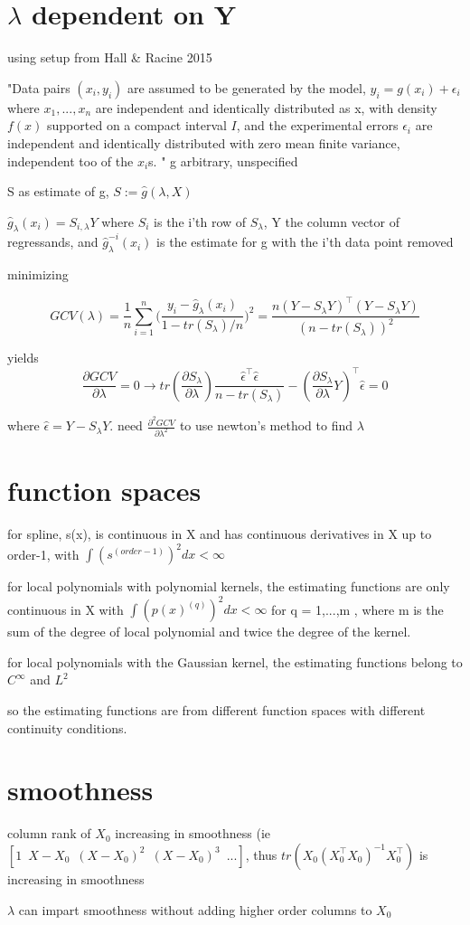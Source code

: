 \documentclass[11pt]{article}
\begin{document}
\section{$\lambda$ dependent on Y}
using setup from Hall \& Racine 2015

"﻿Data pairs $(x_i,y_i)$  are assumed to be generated by the model,  $y_i = g(x_i)+\epsilon_i$ where $x_1,...,x_n$ are independent and identically distributed as x, with density $f(x)$ supported on a compact interval $I$, and the experimental errors $\epsilon_i$ are independent and identically distributed with zero mean finite variance, independent too of the $x_i$s. "  g arbitrary, unspecified

S as estimate of g, $S := \hat{g}(\lambda, X)$

$\hat{g}_\lambda(x_i) = S_{i,\lambda}Y$ where $S_i$ is the i'th row of $S_\lambda$, Y the column vector of regressands, and $\hat{g}_\lambda^{-i}(x_i)$ is the estimate for g with the i'th data point removed

minimizing 

$$GCV(\lambda) = \frac{1}{n} \sum\limits_{i=1}^n \Big(\frac{y_i-\hat{g}_\lambda(x_i)}{1-tr(S_\lambda)/n} \Big)^2 = \frac{n(Y-S_\lambda Y)^\top(Y-S_\lambda Y)}{(n-tr(S_\lambda))^2}$$

yields 
$$\frac{\partial GCV}{\partial \lambda} = 0 \rightarrow  tr(\frac{\partial S_\lambda}{\partial \lambda})\frac{\hat{\epsilon}^\top\hat{\epsilon}}{n-tr(S_\lambda)} - (\frac{\partial S_\lambda}{\partial \lambda}Y)^\top \hat{\epsilon}  =0$$

where $\hat{\epsilon} = Y-S_\lambda Y$. need $\frac{\partial ^2 GCV}{\partial \lambda ^2}$ to use newton's method to find $\lambda$

\section{function spaces}

for spline, s(x), is continuous in X and has continuous derivatives in X up to order-1, with $\int (s^{(order-1)})^2 dx < \infty$

for local polynomials with polynomial kernels, the estimating functions are only continuous in X with 
$\int (p(x)^{(q)})^2 dx < \infty$ for q = 1,...,m , where m is the sum of the degree of local polynomial and twice the degree of the kernel.

for local polynomials with the Gaussian kernel, the estimating functions belong to $C^\infty$ and $L^2$

so the estimating functions are from different function spaces with different continuity conditions.

\section{smoothness}

column rank of $X_0$ increasing in smoothness (ie $[1 \enspace X-X_0 \enspace (X-X_0)^2 \enspace (X-X_0)^3 \enspace ...]$, thus $tr(X_0(X_0^\top X_0)^{-1}X_0^\top )$ is increasing in smoothness

$\lambda$ can impart smoothness without adding higher order columns to $X_0$
\end{document}
